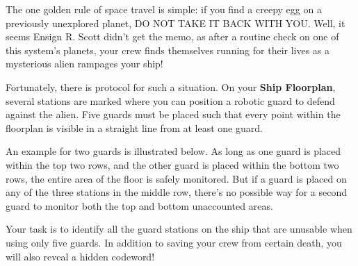 The one golden rule of space travel is simple: if you find a creepy
egg on a previously unexplored planet, DO NOT TAKE IT BACK WITH YOU.
Well, it seems Ensign R. Scott didn't get the memo, as after
a routine check on one of this system's planets, your crew finds
themselves running for their lives as a mysterious alien
rampages your ship!

Fortunately, there is protocol for such a situation. On your
\textbf{Ship Floorplan}, several stations are marked where you
can position a robotic guard to defend against the alien. 
Five guards must be placed such that every point within the floorplan
is visible in a straight line from at least one guard.

An example for two guards is illustrated below. As long as one
guard is placed within the top two rows, and the other guard is
placed within the bottom two rows, the entire area of the floor
is safely monitored. But if a guard is placed on any of the
three stations in the middle row,
there's no possible way for a second guard to monitor both
the top and bottom unaccounted areas.

Your task is to identify all the guard stations on the ship that
are unusable when using only five guards. 
In addition to saving your crew from
certain death, you will also reveal a hidden codeword!

\begin{center}

\hspace{0.2in}
\end{center} 
